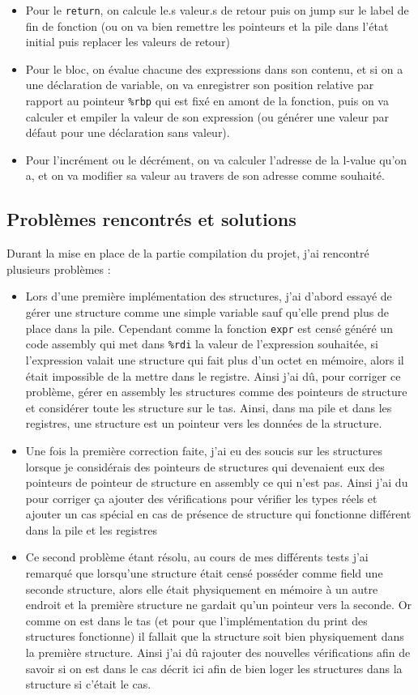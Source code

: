 \documentclass[10pt]{report}
\begin{document}
\begin{itemize}
  \item Pour le \verb|return|, on calcule le.s valeur.s de retour puis on jump sur le label de fin de fonction (ou on va bien remettre les pointeurs et la pile dans l'état initial puis replacer les valeurs de retour)
  \item Pour le bloc, on évalue chacune des expressions dans son contenu, et si on a une déclaration de variable, on va enregistrer son position relative par rapport au pointeur \verb|%rbp| qui est fixé en amont de la fonction, puis on va calculer et empiler la valeur de son expression (ou générer une valeur par défaut pour une déclaration sans valeur).
  \item Pour l'incrément ou le décrément, on va calculer l'adresse de la l-value qu'on a, et on va modifier sa valeur au travers de son adresse comme souhaité.
\end{itemize}

\subsection{Problèmes rencontrés et solutions}

Durant la mise en place de la partie compilation du projet, j'ai rencontré plusieurs problèmes :
\begin{itemize}
  \item Lors d'une première implémentation des structures, j'ai d'abord essayé de gérer une structure comme une simple variable sauf qu'elle prend plus de place dans la pile. Cependant comme la fonction \verb|expr| est censé généré un code assembly qui met dans \verb|%rdi| la valeur de l'expression souhaitée, si l'expression valait une structure qui fait plus d'un octet en mémoire, alors il était impossible de la mettre dans le registre. Ainsi j'ai dû, pour corriger ce problème, gérer en assembly les structures comme des pointeurs de structure et considérer toute les structure sur le tas. Ainsi, dans ma pile et dans les registres, une structure est un pointeur vers les données de la structure.
  \item Une fois la première correction faite, j'ai eu des soucis sur les structures lorsque je considérais des pointeurs de structures qui devenaient eux des pointeurs de pointeur de structure en assembly ce qui n'est pas. Ainsi j'ai du pour corriger ça ajouter des vérifications pour vérifier les types réels et ajouter un cas spécial en cas de présence de structure qui fonctionne différent dans la pile et les registres
  \item Ce second problème étant résolu, au cours de mes différents tests j'ai remarqué que lorsqu'une structure était censé posséder comme field une seconde structure, alors elle était physiquement en mémoire à un autre endroit et la première structure ne gardait qu'un pointeur vers la seconde. Or comme on est dans le tas (et pour que l'implémentation du print des structures fonctionne) il fallait que la structure soit bien physiquement dans la première structure. Ainsi j'ai dû rajouter des nouvelles vérifications afin de savoir si on est dans le cas décrit ici afin de bien loger les structures dans la structure si c'était le cas.
\end{itemize}
\end{document}
